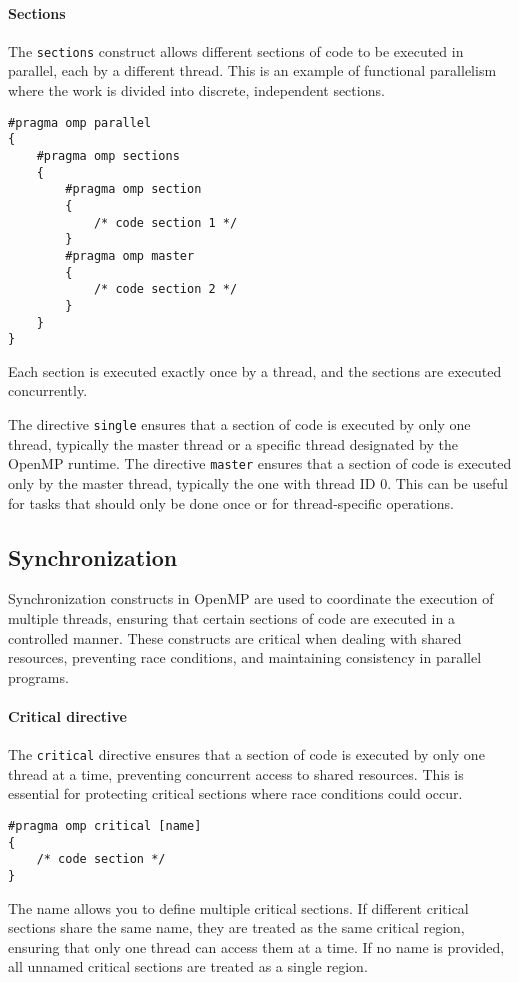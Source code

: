 \paragraph*{Sections}
The \texttt{sections} construct allows different sections of code to be executed in parallel, each by a different thread. 
This is an example of functional parallelism where the work is divided into discrete, independent sections.
\begin{lstlisting}[style=C]
#pragma omp parallel 
{
    #pragma omp sections 
    {
        #pragma omp section 
        {
            /* code section 1 */
        }
        #pragma omp master 
        {
            /* code section 2 */
        }
    }
}
\end{lstlisting}
Each section is executed exactly once by a thread, and the sections are executed concurrently.

The directive \texttt{single} ensures that a section of code is executed by only one thread, typically the master thread or a specific thread designated by the OpenMP runtime.
The directive \texttt{master} ensures that a section of code is executed only by the master thread, typically the one with thread ID 0. This can be useful for tasks that should only be done once or for thread-specific operations.

\subsection{Synchronization}
Synchronization constructs in OpenMP are used to coordinate the execution of multiple threads, ensuring that certain sections of code are executed in a controlled manner. 
These constructs are critical when dealing with shared resources, preventing race conditions, and maintaining consistency in parallel programs.

\paragraph*{Critical directive}
The \texttt{critical} directive ensures that a section of code is executed by only one thread at a time, preventing concurrent access to shared resources. 
This is essential for protecting critical sections where race conditions could occur.
\begin{lstlisting}[style=C]
#pragma omp critical [name] 
{
    /* code section */
}
\end{lstlisting}
The name allows you to define multiple critical sections. 
If different critical sections share the same name, they are treated as the same critical region, ensuring that only one thread can access them at a time.
If no name is provided, all unnamed critical sections are treated as a single region.

